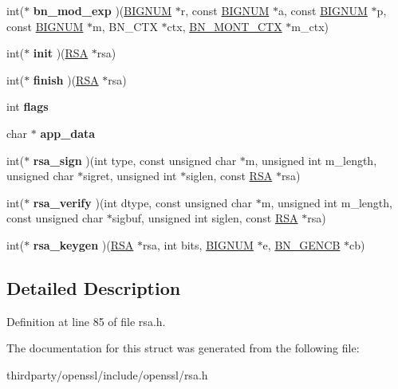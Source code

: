 \begin{DoxyCompactItemize}
\item 
\mbox{\label{structrsa__meth__st_a1dc3f40f6072ffed989d7dfedc66cda1}} 
int($\ast$ {\bfseries bn\+\_\+mod\+\_\+exp} )(\hyperlink{structbignum__st}{B\+I\+G\+N\+UM} $\ast$r, const \hyperlink{structbignum__st}{B\+I\+G\+N\+UM} $\ast$a, const \hyperlink{structbignum__st}{B\+I\+G\+N\+UM} $\ast$p, const \hyperlink{structbignum__st}{B\+I\+G\+N\+UM} $\ast$m, B\+N\+\_\+\+C\+TX $\ast$ctx, \hyperlink{structbn__mont__ctx__st}{B\+N\+\_\+\+M\+O\+N\+T\+\_\+\+C\+TX} $\ast$m\+\_\+ctx)
\item 
\mbox{\label{structrsa__meth__st_ac8c394e65dbeda15573657fb550c5fe7}} 
int($\ast$ {\bfseries init} )(\hyperlink{structrsa__st}{R\+SA} $\ast$rsa)
\item 
\mbox{\label{structrsa__meth__st_a12aded957112894c6fd832168a380fbc}} 
int($\ast$ {\bfseries finish} )(\hyperlink{structrsa__st}{R\+SA} $\ast$rsa)
\item 
\mbox{\label{structrsa__meth__st_ab01ea2742087308a50209ccff23832c7}} 
int {\bfseries flags}
\item 
\mbox{\label{structrsa__meth__st_a3d4a936065797413aad5dc1c7a132f00}} 
char $\ast$ {\bfseries app\+\_\+data}
\item 
\mbox{\label{structrsa__meth__st_a9417375cd40a1ebef8631897593212e5}} 
int($\ast$ {\bfseries rsa\+\_\+sign} )(int type, const unsigned char $\ast$m, unsigned int m\+\_\+length, unsigned char $\ast$sigret, unsigned int $\ast$siglen, const \hyperlink{structrsa__st}{R\+SA} $\ast$rsa)
\item 
\mbox{\label{structrsa__meth__st_a9a5b98e6b902fd0a31b0663b91460627}} 
int($\ast$ {\bfseries rsa\+\_\+verify} )(int dtype, const unsigned char $\ast$m, unsigned int m\+\_\+length, const unsigned char $\ast$sigbuf, unsigned int siglen, const \hyperlink{structrsa__st}{R\+SA} $\ast$rsa)
\item 
\mbox{\label{structrsa__meth__st_a08d964380b9ca4fd0d7664fe0d14dfd0}} 
int($\ast$ {\bfseries rsa\+\_\+keygen} )(\hyperlink{structrsa__st}{R\+SA} $\ast$rsa, int bits, \hyperlink{structbignum__st}{B\+I\+G\+N\+UM} $\ast$e, \hyperlink{structbn__gencb__st}{B\+N\+\_\+\+G\+E\+N\+CB} $\ast$cb)
\end{DoxyCompactItemize}


\subsection{Detailed Description}


Definition at line 85 of file rsa.\+h.



The documentation for this struct was generated from the following file\+:\begin{DoxyCompactItemize}
\item 
thirdparty/openssl/include/openssl/rsa.\+h\end{DoxyCompactItemize}
